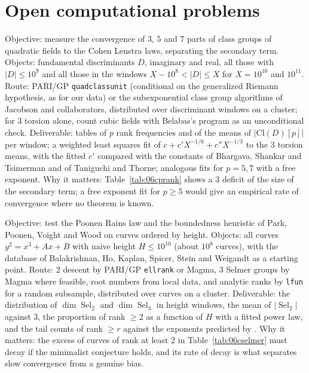 \section{Open computational problems}

\begin{compproblem}\label{cp:06cclscale}
Objective: measure the convergence of $3$, $5$ and $7$ parts of class groups of quadratic fields to the Cohen Lenstra laws, separating the secondary term. Objects: fundamental discriminants $D$, imaginary and real, all those with $|D|\le10^9$ and all those in the windows $X-10^8<|D|\le X$ for $X = 10^{10}$ and $10^{11}$. Route: PARI/GP \texttt{quadclassunit} (conditional on the generalized Riemann hypothesis, as for our data) or the subexponential class group algorithms of Jacobson and collaborators, distributed over discriminant windows on a cluster; for $3$ torsion alone, count cubic fields with Belabas's program as an unconditional check. Deliverable: tables of $p$ rank frequencies and of the means of $|\mathrm{Cl}(D)[p]|$ per window; a weighted least squares fit of $c+c'X^{-1/6}+c''X^{-1/3}$ to the $3$ torsion means, with the fitted $c'$ compared with the constants of Bhargava, Shankar and Tsimerman and of Taniguchi and Thorne; analogous fits for $p = 5,7$ with a free exponent. Why it matters: Table~\ref{tab:06cprank} shows a $3$ deficit of the size of the secondary term; a free exponent fit for $p\ge5$ would give an empirical rate of convergence where no theorem is known.
\end{compproblem}

\begin{compproblem}\label{cp:06cheight}
Objective: test the Poonen Rains law and the boundedness heuristic of Park, Poonen, Voight and Wood on curves ordered by height. Objects: all curves $y^2 = x^3+Ax+B$ with naive height $H\le10^{10}$ (about $10^8$ curves), with the database of Balakrishnan, Ho, Kaplan, Spicer, Stein and Weigandt \cite{bhkssw2016} as a starting point. Route: $2$ descent by PARI/GP \texttt{ellrank} or Magma, $3$ Selmer groups by Magma where feasible, root numbers from local data, and analytic ranks by \texttt{lfun} for a random subsample, distributed over curves on a cluster. Deliverable: the distribution of $\dim\operatorname{Sel}_2$ and $\dim\operatorname{Sel}_3$ in height windows, the mean of $|\operatorname{Sel}_2|$ against $3$, the proportion of rank $\ge2$ as a function of $H$ with a fitted power law, and the tail counts of rank $\ge r$ against the exponents predicted by \cite{ppvw2019}. Why it matters: the excess of curves of rank at least $2$ in Table~\ref{tab:06cselmer} must decay if the minimalist conjecture holds, and its rate of decay is what separates slow convergence from a genuine bias.
\end{compproblem}

